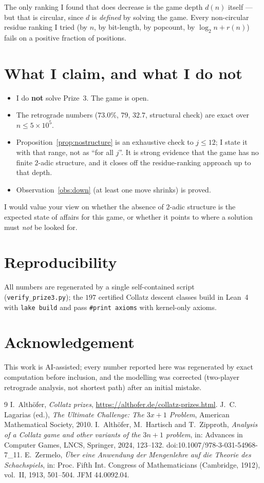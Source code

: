 \documentclass[11pt,a4paper]{article}
\theoremstyle{plain}
\theoremstyle{definition}
\begin{document}
\noindent The only ranking I found that does decrease is the game depth $d(n)$ itself --- but
that is circular, since $d$ is \emph{defined} by solving the game. Every non-circular residue
ranking I tried (by $n$, by bit-length, by popcount, by $\log_2n+r(n)$) fails on a positive
fraction of positions.

\section{What I claim, and what I do not}

\begin{itemize}[nosep]
  \item I do \textbf{not} solve Prize~3. The game is open.
  \item The retrograde numbers ($73.0\%$, $79$, $32.7$, structural check) are exact over
        $n\le5\times10^{5}$.
  \item Proposition~\ref{prop:nostructure} is an exhaustive check to $j\le12$; I state it with
        that range, not as ``for all $j$''. It is strong evidence that the game has no
        finite $2$-adic structure, and it closes off the residue-ranking approach up to that
        depth.
  \item Observation~\ref{obs:down} (at least one move shrinks) is proved.
\end{itemize}

I would value your view on whether the absence of $2$-adic structure is the expected state of
affairs for this game, or whether it points to where a solution must \emph{not} be looked for.

\section*{Reproducibility}
All numbers are regenerated by a single self-contained script
(\texttt{verify\_prize3.py}); the $197$ certified Collatz descent classes build in Lean~4
with \texttt{lake build} and pass \texttt{\#print axioms} with kernel-only axioms.

\section*{Acknowledgement}
This work is AI-assisted; every number reported here was regenerated by exact computation
before inclusion, and the modelling was corrected (two-player retrograde analysis, not
shortest path) after an initial mistake.

\begin{thebibliography}{9}
 I.~Alth\"ofer, \emph{Collatz prizes},
\url{https://althofer.de/collatz-prizes.html}.
 J.~C. Lagarias (ed.), \emph{The Ultimate Challenge: The $3x+1$ Problem},
American Mathematical Society, 2010.
 I.~Alth\"ofer, M.~Hartisch and T.~Zipproth, \emph{Analysis of a Collatz game and
other variants of the $3n+1$ problem}, in: Advances in Computer Games, LNCS, Springer, 2024,
123--132. doi:10.1007/978-3-031-54968-7\_11.
 E.~Zermelo, \emph{\"Uber eine Anwendung der Mengenlehre auf die Theorie des
Schachspiels}, in: Proc. Fifth Int. Congress of Mathematicians (Cambridge, 1912), vol.~II,
1913, 501--504. JFM 44.0092.04.
\end{thebibliography}
\end{document}
